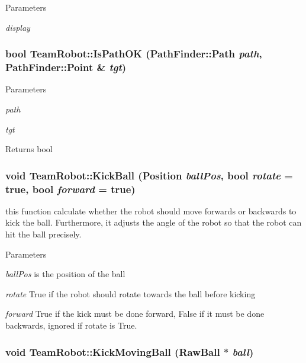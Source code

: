 \begin{DoxyParams}{Parameters}
\item[{\em display}]\end{DoxyParams}
\hypertarget{classTeamRobot_afb5f9191ca185053af37c1ae1f8dcb17}{
\subsubsection[{IsPathOK}]{\setlength{\rightskip}{0pt plus 5cm}bool TeamRobot::IsPathOK ({\bf PathFinder::Path} {\em path}, \/  {\bf PathFinder::Point} \& {\em tgt})}}
\label{classTeamRobot_afb5f9191ca185053af37c1ae1f8dcb17}

\begin{DoxyParams}{Parameters}
\item[{\em path}]\item[{\em tgt}]\end{DoxyParams}
\begin{DoxyReturn}{Returns}
bool 
\end{DoxyReturn}
\hypertarget{classTeamRobot_a36d006bfeadfcdd37bd1eeb47223bdba}{
\subsubsection[{KickBall}]{\setlength{\rightskip}{0pt plus 5cm}void TeamRobot::KickBall (Position {\em ballPos}, \/  bool {\em rotate} = {\ttfamily true}, \/  bool {\em forward} = {\ttfamily true})}}
\label{classTeamRobot_a36d006bfeadfcdd37bd1eeb47223bdba}


this function calculate whether the robot should move forwards or backwards to kick the ball. Furthermore, it adjusts the angle of the robot so that the robot can hit the ball precisely. 


\begin{DoxyParams}{Parameters}
\item[{\em ballPos}]is the position of the ball \item[{\em rotate}]True if the robot should rotate towards the ball before kicking \item[{\em forward}]True if the kick must be done forward, False if it must be done backwards, ignored if rotate is True. \end{DoxyParams}
\hypertarget{classTeamRobot_a98d044ad3907493236b2d399a26cb9ac}{
\subsubsection[{KickMovingBall}]{\setlength{\rightskip}{0pt plus 5cm}void TeamRobot::KickMovingBall (RawBall $\ast$ {\em ball})}}
\label{classTeamRobot_a98d044ad3907493236b2d399a26cb9ac}

